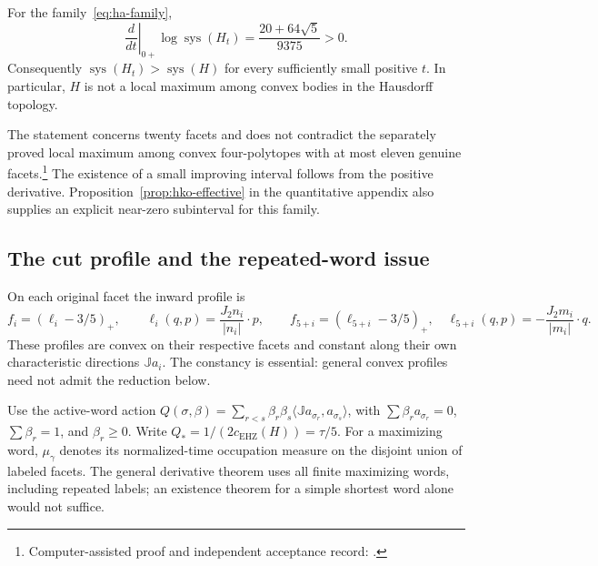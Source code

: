 \begin{theorem}\label{thm:ha-ascent}
For the family~\eqref{eq:ha-family},
\begin{equation}\label{eq:ha-slope}
 \left.\frac{d}{dt}\right|_{0+}\log\operatorname{sys}(H_t)
       =\frac{20+64\sqrt5}{9375}>0.
\end{equation}
Consequently $\operatorname{sys}(H_t)>\operatorname{sys}(H)$ for every
sufficiently small positive $t$. In particular, $H$ is not a local maximum
among convex bodies in the Hausdorff topology.
\end{theorem}

The statement concerns twenty facets and does not contradict the
separately proved local maximum among convex four-polytopes with at most
eleven genuine facets.\footnote{Computer-assisted proof and independent
acceptance record:
.}
The existence of a small improving interval follows from the positive
derivative. Proposition~\ref{prop:hko-effective} in the quantitative appendix
also supplies an explicit near-zero subinterval for this family.

\subsection{The cut profile and the repeated-word issue}

On each original facet the inward profile is
\begin{equation}\label{eq:ha-profile}
 f_i=(\ell_i-3/5)_+,\qquad
 \ell_i(q,p)=\frac{J_2n_i}{|n_i|}\cdot p,
 \qquad
 f_{5+i}=(\ell_{5+i}-3/5)_+,\quad
 \ell_{5+i}(q,p)=-\frac{J_2m_i}{|m_i|}\cdot q.
\end{equation}
These profiles are convex on their respective facets and constant along
their own characteristic directions $\mathbb{J}a_i$. The constancy is essential:
general convex profiles need not admit the reduction below.

Use the active-word action
$Q(\sigma,\beta)=\sum_{r<s}\beta_r\beta_s
\langle \mathbb{J}a_{\sigma_r},a_{\sigma_s}\rangle$, with
$\sum\beta_ra_{\sigma_r}=0$, $\sum\beta_r=1$, and $\beta_r\geq0$.
Write $Q_*=1/(2c_{\mathrm{EHZ}}(H))=\tau/5$.
For a maximizing word, $\mu_\gamma$ denotes its normalized-time occupation
measure on the disjoint union of labeled facets. The general derivative
theorem uses all finite maximizing words, including repeated labels;
an existence theorem for a simple shortest word alone would not suffice.

